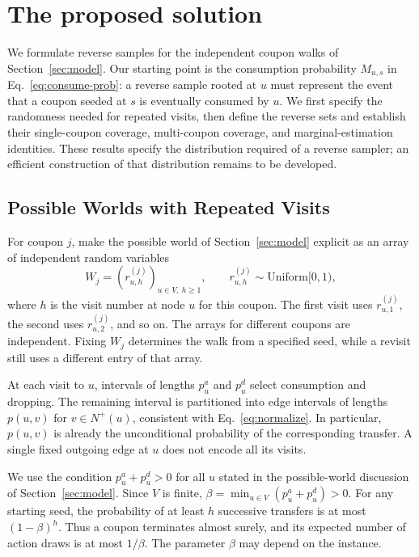 \documentclass[sigconf]{acmart}
\begin{document}
\section{The proposed solution}
\label{sec:algo}

We formulate reverse samples for the independent coupon walks of
Section~\ref{sec:model}. Our starting point is the consumption
probability $M_{u,s}$ in Eq.~\eqref{eq:consume-prob}: a reverse sample
rooted at $u$ must represent the event that a coupon seeded at $s$
is eventually consumed by $u$. We first specify the randomness needed
for repeated visits, then define the reverse sets and establish their
single-coupon coverage, multi-coupon coverage, and marginal-estimation
identities. These results specify the distribution required of a
reverse sampler; an efficient construction of that distribution
remains to be developed.

\subsection{Possible Worlds with Repeated Visits}
\label{sec:visit-world}

For coupon $j$, make the possible world of Section~\ref{sec:model}
explicit as an array of independent random variables
\[
  W_j=(r_{u,h}^{(j)})_{u\in V,\ h\geq1},
  \qquad r_{u,h}^{(j)}\sim\mathrm{Uniform}[0,1),
\]
where $h$ is the visit number at node $u$ for this coupon. The first
visit uses $r_{u,1}^{(j)}$, the second uses $r_{u,2}^{(j)}$, and so on.
The arrays for different coupons are independent. Fixing $W_j$
determines the walk from a specified seed, while a revisit still uses
a different entry of that array.

At each visit to $u$, intervals of lengths $p_u^a$ and $p_u^d$
select consumption and dropping. The remaining interval is partitioned
into edge intervals of lengths $p(u,v)$ for $v\in N^+(u)$, consistent
with Eq.~\eqref{eq:normalize}. In particular, $p(u,v)$ is already the
unconditional probability of the corresponding transfer. A single
fixed outgoing edge at $u$ does not encode all its visits.

We use the condition $p_u^a+p_u^d>0$ for all $u$ stated in the
possible-world discussion of Section~\ref{sec:model}. Since $V$ is
finite, $\beta=\min_{u\in V}(p_u^a+p_u^d)>0$. For any starting seed,
the probability of at least $h$ successive transfers is at most
$(1-\beta)^h$. Thus a coupon terminates almost surely, and its expected
number of action draws is at most $1/\beta$. The parameter $\beta$
may depend on the instance.
\end{document}
